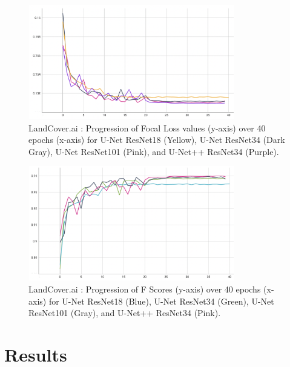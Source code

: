 \documentclass[conference]{IEEEtran}
\begin{document}
\begin{figure}[!h]
    \includegraphics[width=9cm, height=5cm]{images/encoders/encoders_focalloss.png}
    \caption{LandCover.ai : Progression of Focal Loss values (y-axis) over 40 epochs (x-axis) for U-Net ResNet18 (Yellow), U-Net ResNet34 (Dark Gray), U-Net ResNet101 (Pink), and U-Net++ ResNet34 (Purple).}
\end{figure}

\begin{figure}[!h]
    \includegraphics[width=9cm, height=5cm]{images/encoders/encoders_fscore.png}
    \caption{LandCover.ai : Progression of F Scores (y-axis) over 40 epochs (x-axis) for U-Net ResNet18 (Blue), U-Net ResNet34 (Green), U-Net ResNet101 (Gray), and U-Net++ ResNet34 (Pink). }
\end{figure}


\section{Results}
\end{document}
